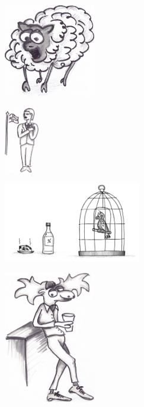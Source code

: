 \sclearpage

\sclearpage

\begin{figure}[!b]
\begin{center}
\includegraphics[width=4cm]{../bilder/far.jpg} 
\end{center}
\end{figure}
\sclearpage


\sclearpage

\begin{figure}[!b]
\begin{center}
\includegraphics[width=15mm]{../bilder/finland.jpg} 
\end{center}
\end{figure}
\sclearpage

\sclearpage

\sclearpage

\begin{figure}[!b]
\begin{center}
\includegraphics[width=6cm]{../bilder/undulaten.png} 
\end{center}
\end{figure}
\sclearpage

\sclearpage

\sclearpage



\begin{figure}[!b]
\begin{center}
\includegraphics[width=40mm]{../bilder/alg.jpg} 
\end{center}
\end{figure}
\sclearpage

\sclearpage


\sclearpage

